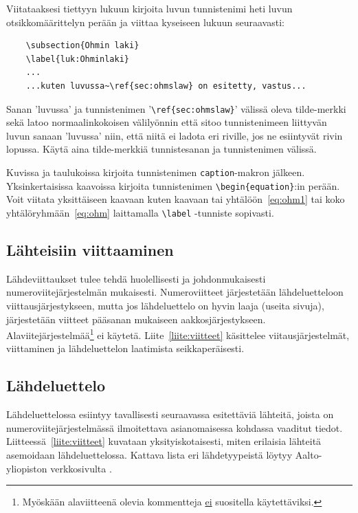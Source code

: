 \documentclass[finnish, 12pt, a4paper, elec, utf8, a-2b, online]{aaltothesis}
\begin{document}
Viitataaksesi tiettyyn lukuun kirjoita luvun tunnistenimi heti luvun 
otsikkomäärittelyn perään ja viittaa kyseiseen lukuun seuraavasti:
\begin{verbatim}
	\subsection{Ohmin laki}
	\label{luk:Ohminlaki}
	...
	...kuten luvussa~\ref{sec:ohmslaw} on esitetty, vastus...
\end{verbatim}
Sanan 'luvussa' ja tunnistenimen '\verb+\ref{sec:ohmslaw}+' välissä oleva 
tilde-merkki sekä latoo normaalinkokoisen välilyönnin että sitoo tunnistenimeen 
liittyvän luvun sanaan 'luvussa' niin, että niitä ei ladota eri riville, jos ne 
esiintyvät rivin lopussa. Käytä aina tilde-merkkiä tunnistesanan ja 
tunnistenimen välissä.

Kuvissa ja taulukoissa kirjoita tunnistenimen \verb+caption+-makron jälkeen. 
Yksinkertaisissa kaavoissa kirjoita tunnistenimen \verb+\begin{equation}+:in
perään. Voit viitata yksittäiseen kaavaan kuten kaavaan tai 
yhtälöön~\ref{eq:ohm1} tai koko yhtälöryhmään~\ref{eq:ohm} laittamalla 
\verb+\label+ -tunniste sopivasti.

\subsection{Lähteisiin viittaaminen}

Lähdeviittaukset tulee tehdä huolellisesti ja johdonmukaisesti
numeroviitejärjestelmän mukaisesti. Numeroviitteet järjestetään lähdeluetteloon 
viittausjärjestykseen, mutta jos lähdeluettelo on hyvin laaja (useita sivuja), 
järjestetään viitteet pääsanan mukaiseen aakkosjärjestykseen. 
Alaviitejärjestelmää\footnote{Myöskään alaviitteenä olevia kommentteja 
\underline{ei} suositella käytettäviksi.} ei käytetä. Liite~\ref{liite:viitteet}
käsittelee viitausjärjestelmät, viittaminen ja lähdeluettelon laatimista 
seikkaperäisesti. 

\subsection{Lähdeluettelo} 

Lähdeluettelossa esiintyy tavallisesti seuraavassa esitettäviä lähteitä, joista 
on numeroviitejärjestelmässä ilmoitettava asianomaisessa kohdassa vaaditut 
tiedot. Liitteessä~\ref{liite:viitteet} kuvataan yksityiskotaisesti, miten 
erilaisia lähteitä asemoidaan lähdeluettelossa. Kattava lista eri lähdetyypeistä 
löytyy Aalto-yliopiston verkkosivulta \cite{aaltolib}.\\
\end{document}
